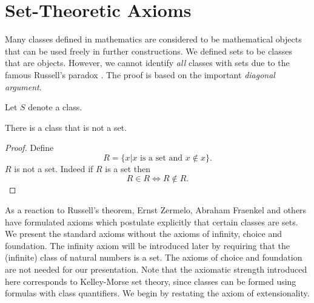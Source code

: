 \documentclass{article}
\begin{document}
\section{Set-Theoretic Axioms}

Many classes defined in mathematics are considered to be
mathematical objects that can be used freely in further constructions.
We defined sets to be classes that are objects. However, we cannot
identify {\em all} classes with sets due to the famous
Russell's paradox \cite{Russell1903}.
The proof is based on the important {\em diagonal argument}.

\begin{forthel}
Let $S$ denote a class.

\begin{theorem}[Russell]
There is a class that is not a set.
\end{theorem}
\begin{proof}
Define $$R = \{x |\text{$x$ is a set and $x \notin x$}\}.$$
$R$ is not a set.
Indeed if $R$ is a set then $$R \in R \iff R \notin R.$$
\end{proof}
\end{forthel}

As a reaction to Russell's theorem, Ernst Zermelo, Abraham
Fraenkel and others have formulated axioms which
postulate explicitly that certain classes are sets. We
present the standard axioms without
the axioms of infinity, choice and foundation. The infinity
axiom will be introduced later by requiring that the
(infinite) class
of natural numbers is a set. The axioms of choice
and foundation are not needed for our presentation.
Note that the axiomatic strength introduced here corresponds
to Kelley-Morse set theory, since classes can be formed using
formulas with class quantifiers.
We begin by restating
the axiom of extensionality.
\end{document}

